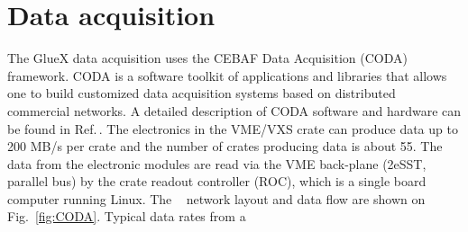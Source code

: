 
\section[Data Acquisition]{Data acquisition \label{sec:daq}}



The GlueX data acquisition uses the CEBAF Data Acquisition (CODA) framework. CODA is a software toolkit of applications and libraries that allows one to build customized data acquisition systems based on distributed commercial networks. A detailed description of CODA software and hardware can be found in Ref.\,\cite{CLAS12_DAQ}. 
The electronics in the VME/VXS crate can produce data up to 200 MB/s per crate and the
number of crates producing data is about 55.
The data from the electronic modules are read via the VME back-plane (2eSST, parallel bus) by the crate readout controller (ROC), which is a single board computer running Linux.
The \gx~ network layout and data flow are shown on Fig.~\ref{fig:CODA}.
Typical data rates from a %

